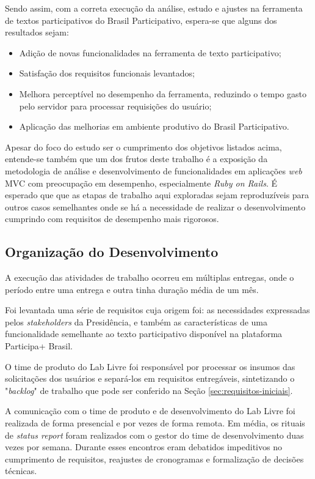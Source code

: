 Sendo assim, com a correta execução da análise, estudo e ajustes na ferramenta de textos participativos do Brasil Participativo, espera-se que alguns dos resultados sejam:

\begin{itemize}
  \item Adição de novas funcionalidades na ferramenta de texto participativo;
  \item Satisfação dos requisitos funcionais levantados;
  \item Melhora perceptível no desempenho da ferramenta, reduzindo o tempo gasto pelo servidor para processar requisições do usuário;
  \item Aplicação das melhorias em ambiente produtivo do Brasil Participativo.
\end{itemize}

Apesar do foco do estudo ser o cumprimento dos objetivos listados acima, entende-se também que um dos frutos deste trabalho é a exposição da metodologia de análise e desenvolvimento de funcionalidades em aplicações \textit{web} MVC com preocupação em desempenho, especialmente \textit{Ruby on Rails}.
É esperado que que as etapas de trabalho aqui exploradas sejam reproduzíveis para outros casos semelhantes onde se há a necessidade de realizar o desenvolvimento cumprindo com requisitos de desempenho mais rigorosos.

\subsection {Organização do Desenvolvimento}
\label{sec:organizacao-do-desenvolvimento}

A execução das atividades de trabalho ocorreu em múltiplas entregas, onde o período entre uma entrega e outra tinha duração média de um mês.

Foi levantada uma série de requisitos cuja origem foi: as necessidades expressadas pelos \textit{stakeholders} da Presidência, e também as características de uma funcionalidade semelhante ao texto participativo disponível na plataforma Participa+ Brasil.

O time de produto do Lab Livre foi responsável por processar os insumos das solicitações dos usuários e separá-los em requisitos entregáveis, sintetizando o "\textit{backlog}" de trabalho que pode ser conferido na Seção \ref{sec:requisitos-iniciais}.

A comunicação com o time de produto e de desenvolvimento do Lab Livre foi realizada de forma presencial e por vezes de forma remota. Em média, os rituais de \textit{status report} foram realizados com o gestor do time de desenvolvimento duas vezes por semana. Durante esses encontros eram debatidos impeditivos no cumprimento de requisitos, reajustes de cronogramas e formalização de decisões técnicas.

